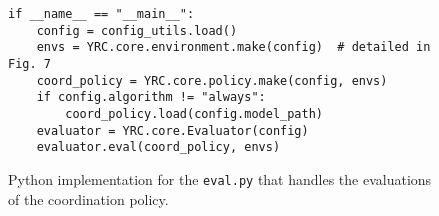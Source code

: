 \begin{figure*}[t]
\centering
\begin{tcolorbox}[title={\begin{pseudo}Main Evaluation Script\end{pseudo}}, colback=sbPurple025, colframe=sbPurple]
\begin{verbatim}
if __name__ == "__main__":
    config = config_utils.load()
    envs = YRC.core.environment.make(config)  # detailed in Fig. 7
    coord_policy = YRC.core.policy.make(config, envs)
    if config.algorithm != "always":
        coord_policy.load(config.model_path)
    evaluator = YRC.core.Evaluator(config)
    evaluator.eval(coord_policy, envs)
\end{verbatim}
\end{tcolorbox}
\caption{Python implementation for the \texttt{eval.py} that handles the evaluations of the coordination policy.}
\label{fig:eval}
\end{figure*}

